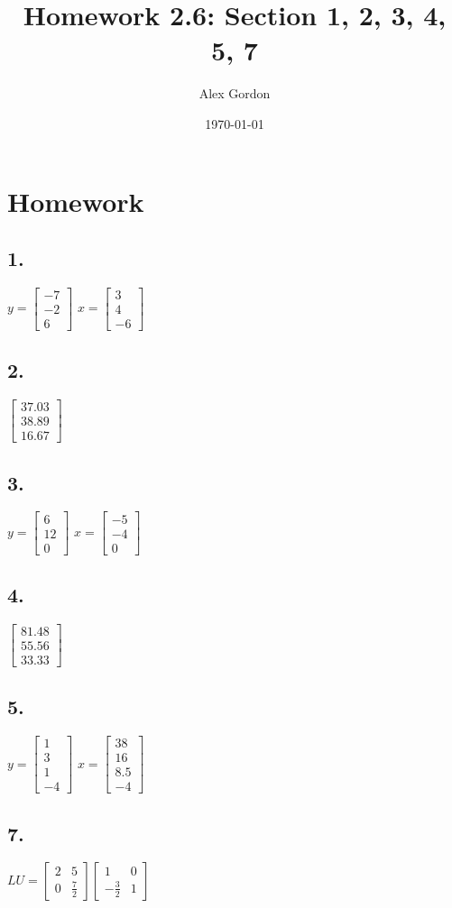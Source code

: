 \documentclass[12]{scrartcl}
\begin{document}
\title{Homework 2.6: Section 1, 2, 3, 4, 5, 7}
\author{Alex Gordon}
\date{\today}
\maketitle
\section*{Homework}
\subsection*{1.}
$ y =  \begin{bmatrix}-7 \\ -2 \\ 6   \end{bmatrix}$
$ x =  \begin{bmatrix} 3 \\ 4 \\ -6   \end{bmatrix}$
\subsection*{2.}
$ \begin{bmatrix} 37.03 \\ 38.89 \\ 16.67   \end{bmatrix}$
\subsection*{3.}
$ y =  \begin{bmatrix} 6 \\ 12 \\ 0   \end{bmatrix}$
$ x =  \begin{bmatrix} -5 \\ -4 \\ 0   \end{bmatrix}$
\subsection*{4.}
$ \begin{bmatrix} 81.48 \\ 55.56 \\ 33.33   \end{bmatrix}$
\subsection*{5.}
$ y =  \begin{bmatrix} 1 \\ 3 \\ 1 \\-4   \end{bmatrix}$
$ x =  \begin{bmatrix} 38 \\ 16 \\ 8.5 \\ -4  \end{bmatrix}$
\subsection*{7.}
$ LU =  \begin{bmatrix} 2 & 5 \\ 0 & \frac{7}{2} \end{bmatrix}  \begin{bmatrix} 1 & 0 \\ -\frac{3}{2} & 1 \end{bmatrix}$
\end{document}
